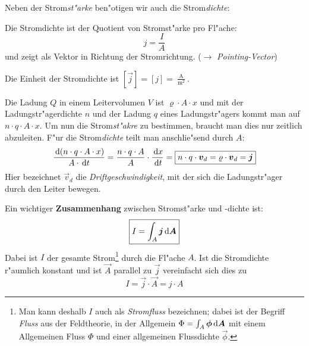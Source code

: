 Neben der Strom\emph{st"arke} ben"otigen wir auch die
Strom\emph{dichte}:
\begin{Def}
    Die Stromdichte ist der
   Quotient von Stromst"arke pro Fl"ache:
   \begin{equation}
      \label{eqn_differenz-c62}
      j = \frac{I}{A}
   \end{equation}
   und zeigt als Vektor in Richtung der Stromrichtung. ($\to$
   \emph{Pointing-Vector}) 
\end{Def}
Die Einheit der Stromdichte ist $[\vec j] = [j] =
\frac{\operatorname{A}}{\operatorname{m}^2}$.

Die Ladung $Q$ in einem Leitervolumen $V$ ist $\varrho \cdot A \cdot
x$ und mit der Ladungstr"agerdichte $n$ und der Ladung $q$ eines
Ladungstr"agers kommt man auf $n \cdot q \cdot A \cdot x$. Um nun die
Strom\emph{st"akre} zu bestimmen, braucht man dies nur zeitlich
abzuleiten. F"ur die Strom\emph{dichte} teilt man anschlie"send durch
$A$:
\begin{equation}
   \label{eqn_differenz-c63}
   \frac{\, \mathrm{d} (n \cdot q \cdot A \cdot x)}{A \cdot \, \mathrm{d} t}
=
   \frac{n \cdot q \cdot A }{A} \cdot \frac{\, \mathrm{d} x}{\, \mathrm{d} t}
=
\boxed{  n \cdot q \cdot \boldsymbol{v}_d = \varrho \cdot \boldsymbol{v}_d = \boldsymbol{j}}
\end{equation}
Hier bezeichnet $\vec v_d$ die
\emph{Driftgeschwindigkeit}, mit der sich
die Ladungstr"ager durch den Leiter bewegen.

Ein wichtiger \textbf{Zusammenhang} zwischen Stromst"arke und -dichte
ist:
\begin{equation}
   \label{eqn_zshg_stromstaerke-stromdichte}
   \boxed{ I = \int_A \boldsymbol{j} \, \mathrm{d} \boldsymbol{A}  }
\end{equation}
Dabei ist $I$ der gesamte Strom\footnote{Man kann deshalb $I$ auch als
  \emph{Stromfluss} bezeichnen; dabei ist der
  Begriff \emph{Fluss} aus der Feldtheorie, in der Allgemein $\Phi =
  \int_A \boldsymbol{\phi} \, \mathrm{d} \boldsymbol{A}$ mit einem Allgemeinen Fluss $\Phi$
  und einer allgemeinen Flussdichte $\vec \phi$.} durch die Fl"ache
$A$. Ist die Stromdichte r"aumlich konstant und ist $\vec A$ parallel
zu $\vec j$ vereinfacht
sich dies zu
\begin{equation*}
   I = \vec j \cdot \vec A = j \cdot A
\end{equation*}


